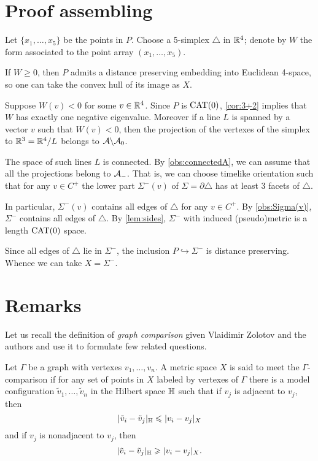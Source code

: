\documentclass{article}
\begin{document}
\section{Proof assembling}

Let $\{x_1,\dots,x_5\}$ be the points in $P$.
Choose a 5-simplex $\triangle$ in $\mathbb{R}^4$; denote by $W$ the form associated to the point array $(x_1,\dots,x_5)$.

If $W\ge0$, then $P$ admits a distance preserving embedding into Euclidean 4-space, so one can take the convex hull of its image as $X$.

Suppose $W(v)<0$ for some $v\in\mathbb{R}^4$.
Since $P$ is $\mathrm{CAT}(0)$, \ref{cor:3+2} implies that $W$ has exactly one negative eigenvalue.
Moreover if a line $L$ is spanned by a vector $v$ such that $W(v)<0$, then the projection of the vertexes of the simplex to $\mathbb{R}^3=\mathbb{R}^4/L$ belongs to $\mathcal{A}\backslash\mathcal{A}_0$.

The space of such lines $L$ is connected.
By \ref{obs:connectedA}, we can assume that all the projections belong to $\mathcal{A}_-$.
That is, we can choose timelike orientation such that for any $v\in C^+$ the lower part $\Sigma^-(v)$ of $\Sigma=\partial \triangle$ has at least 3 facets of $\triangle$.

In particular, $\Sigma^-(v)$ contains all edges of $\triangle$ for any $v\in C^+$.
By \ref{obs:Sigma(v)}, $\Sigma^-$ contains all edges of $\triangle$.
By \ref{lem:sides}, $\Sigma^-$ with induced (pseudo)metric is a length $\mathrm{CAT}(0)$ space.

Since all edges of $\triangle$ lie in $\Sigma^-$, the inclusion $P\hookrightarrow \Sigma^-$ is distance preserving.
Whence we can take $X=\Sigma^-$.
\qeds

\section{Remarks}

Let us recall the definition of \emph{graph comparison} given Vlaidimir Zolotov and the authors \cite{lebedeva-petrunin-zolotov} and use it to formulate few related questions.

Let $\Gamma$ be a graph with vertexes $v_1,\dots,v_n$.
A metric space $X$ is said to meet the $\Gamma$-comparison if for any set of points in $X$ labeled by vertexes of $\Gamma$ there is a model configuration $\tilde v_1,\dots,\tilde v_n$ in the Hilbert space $\mathbb H$ such that 
if $v_j$ is adjacent to $v_j$, then
\[|\tilde v_i-\tilde v_j|_{\mathbb H}\leqslant | v_i-v_j|_{X}\]
and
if $v_j$ is nonadjacent to $v_j$, then
\[|\tilde v_i-\tilde v_j|_{\mathbb H}\geqslant | v_i-v_j|_{X}.\]
\end{document}
